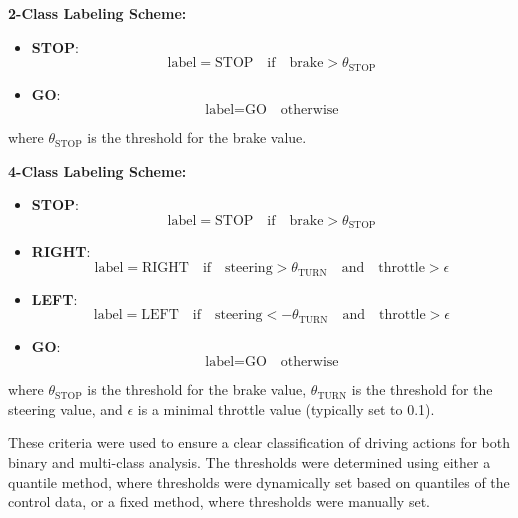 \textbf{2-Class Labeling Scheme:}
\begin{itemize}
    \item \textbf{STOP}: 
    \begin{equation}
    \text{label} = \text{STOP} \quad \text{if} \quad \text{brake} > \theta_{\text{STOP}}
    \end{equation}
    \item \textbf{GO}: 
    \begin{equation}
    \text{label} = \text{GO} \quad \text{otherwise}
    \end{equation}
\end{itemize}
where $\theta_{\text{STOP}}$ is the threshold for the brake value.

\textbf{4-Class Labeling Scheme:}
\begin{itemize}
    \item \textbf{STOP}: 
    \begin{equation}
    \text{label} = \text{STOP} \quad \text{if} \quad \text{brake} > \theta_{\text{STOP}}
    \end{equation}
    \item \textbf{RIGHT}: 
    \begin{equation}
    \text{label} = \text{RIGHT} \quad \text{if} \quad \text{steering} > \theta_{\text{TURN}} \quad \text{and} \quad \text{throttle} > \epsilon
    \end{equation}
    \item \textbf{LEFT}: 
    \begin{equation}
    \text{label} = \text{LEFT} \quad \text{if} \quad \text{steering} < -\theta_{\text{TURN}} \quad \text{and} \quad \text{throttle} > \epsilon
    \end{equation}
    \item \textbf{GO}: 
    \begin{equation}
    \text{label} = \text{GO} \quad \text{otherwise}
    \end{equation}
\end{itemize}
where $\theta_{\text{STOP}}$ is the threshold for the brake value, $\theta_{\text{TURN}}$ is the threshold for the steering value, and $\epsilon$ is a minimal throttle value (typically set to 0.1).

These criteria were used to ensure a clear classification of driving actions for both binary and multi-class analysis. The thresholds were determined using either a quantile method, where thresholds were dynamically set based on quantiles of the control data, or a fixed method, where thresholds were manually set.

